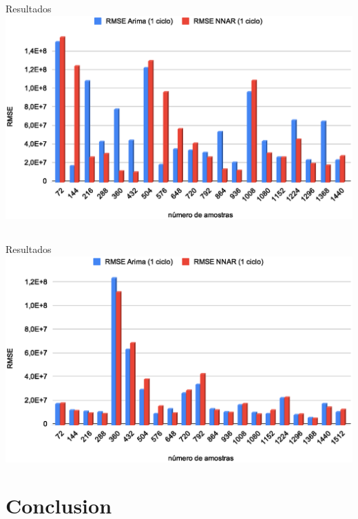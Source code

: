 \documentclass[aspectratio=169]{beamer}
\begin{document}

\subsection{}
\begin{frame}{Resultados}
    \centering
\includegraphics[height=0.50\textwidth,angle=0]{rmse_tsoriginal.eps}
\end{frame}


\subsection{}
\begin{frame}{Resultados}
    \centering
\includegraphics[height=0.50\textwidth,angle=0]{rmse_tsclean.eps}
\end{frame}


\section{Conclusion}
\end{document}
